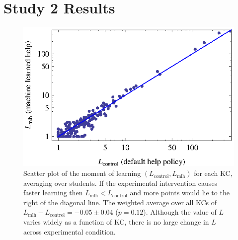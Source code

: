 \documentclass{edm_template}
\begin{document}
\section{Study 2 Results}
%
%

\begin{figure}
   \centering\includegraphics{scatter-step.eps}
   \caption{Scatter plot of the moment of learning $(L_\mbox{control},L_\mbox{mlh})$ for each
     KC, averaging over students.  If the experimental intervention causes
     faster learning then $L_\mbox{mlh}<L_\mbox{control}$ and more points would lie to the 
     right of the diagonal line.
     The weighted average over all KCs of $L_\mbox{mlh}-L_\mbox{control} = -0.05\pm 0.04$ ($p=0.12$).
     Although the value of $L$ varies widely as a function of KC, there
     is no large change in $L$ across experimental condition.
   }\label{scatterstep}
\end{figure}
\end{document}
